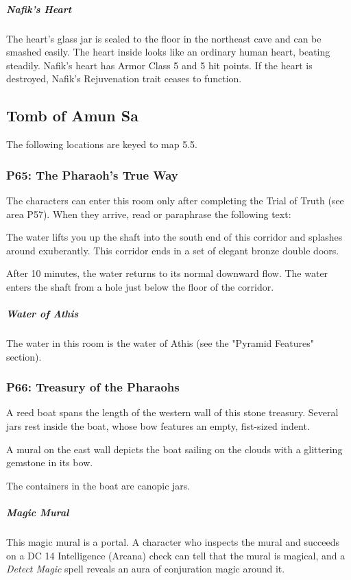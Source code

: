 \documentclass[10pt,a4paper,twoside,bg=print,twocolumn,openany,nodeprecatedcode]{dndbook}
\begin{document}
\subparagraph{Nafik's Heart}
The heart's glass jar is sealed to the floor in the northeast cave and can be smashed easily. The heart inside looks like an ordinary human heart, beating steadily. Nafik's heart has Armor Class 5 and 5 hit points. If the heart is destroyed, Nafik's Rejuvenation trait ceases to function.

\subsection{Tomb of Amun Sa}
The following locations are keyed to map 5.5.

\subsubsection{P65: The Pharaoh's True Way}
The characters can enter this room only after completing the Trial of Truth (see area P57). When they arrive, read or paraphrase the following text:

\begin{DndReadAloud}{}
The water lifts you up the shaft into the south end of this corridor and splashes around exuberantly. This corridor ends in a set of elegant bronze double doors.

\end{DndReadAloud}

After 10 minutes, the water returns to its normal downward flow. The water enters the shaft from a hole just below the floor of the corridor.

\subparagraph{Water of Athis}
The water in this room is the water of Athis (see the "Pyramid Features" section).

\subsubsection{P66: Treasury of the Pharaohs}
\begin{DndReadAloud}{}
A reed boat spans the length of the western wall of this stone treasury. Several jars rest inside the boat, whose bow features an empty, fist-sized indent.

A mural on the east wall depicts the boat sailing on the clouds with a glittering gemstone in its bow.

\end{DndReadAloud}

The containers in the boat are canopic jars.

\subparagraph{Magic Mural}
This magic mural is a portal. A character who inspects the mural and succeeds on a DC 14 Intelligence (Arcana) check can tell that the mural is magical, and a \textit{Detect Magic} spell reveals an aura of conjuration magic around it.
\end{document}
